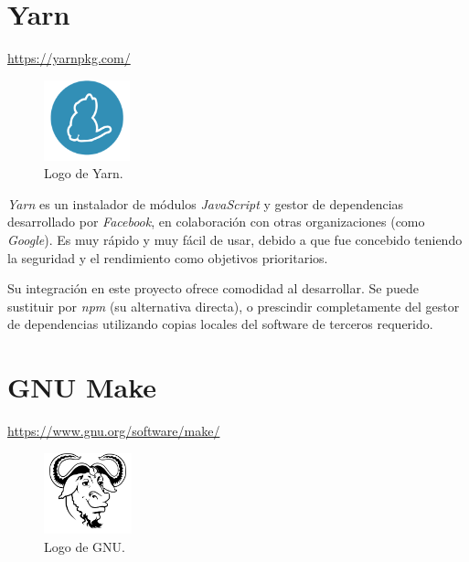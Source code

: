 
\section{Yarn} \label{sec:yarn}

\footnotesize\color{gray}
\url{https://yarnpkg.com/}
\normalsize\color{black}\sn

\begin{figure}
\includegraphics[width=2.5cm]{img/tables/12_Yarn.png}
\caption{Logo de Yarn.}
\label{fig:yarn}
\end{figure}

\textit{Yarn} es un instalador de módulos \textit{JavaScript} y gestor de dependencias desarrollado por \textit{Facebook}, en colaboración con otras organizaciones (como \textit{Google}). Es muy rápido y muy fácil de usar, debido a que fue concebido teniendo la seguridad y el rendimiento como objetivos prioritarios.\sn

Su integración en este proyecto ofrece comodidad al desarrollar. Se puede sustituir por \textit{npm} (su alternativa directa), o prescindir completamente del gestor de dependencias utilizando copias locales del software de terceros requerido.\sn


\section{GNU Make} \label{sec:make}

\footnotesize\color{gray}
\url{https://www.gnu.org/software/make/}
\normalsize\color{black}\sn

\begin{figure}
\includegraphics[width=2.55cm]{img/tables/14_GNU-Make.png}
\caption{Logo de GNU.}
\label{fig:make}
\end{figure}

